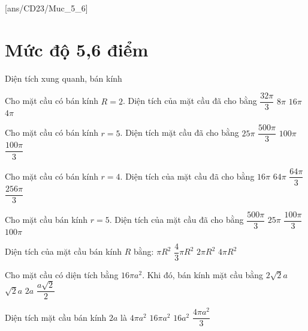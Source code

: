 [ans/CD23/Muc_5_6]
\setcounter{ex}{0}
\setcounter{dang}{0}
\section{Mức độ 5,6 điểm}
\begin{dang}
	{Diện tích xung quanh, bán kính}
\end{dang}
\begin{ex}
	Cho mặt cầu có bán kính $R=2$. Diện tích của mặt cầu đã cho bằng
	\choice
	{$\dfrac{32\pi}{3}$}
	{$8\pi $}
	{\True $16\pi $}
	{$4\pi $}
\end{ex}
\begin{ex}
	[Mã 102 - 2020 Lần 2]%
	Cho mặt cầu có bán kính $r=5$. Diện tích mặt cầu đã cho bằng
	\choice
	{$25\pi $}
	{$\dfrac{500\pi}{3}$}
	{\True $100\pi $}
	{$\dfrac{100\pi}{3}$}
\end{ex}
\begin{ex}
	[Mã 103 - 2020 Lần 2]%
	Cho mặt cầu có bán kính $r=4$. Diện tích của mặt cầu đã cho bằng
	\choice
	{$16\pi $}
	{\True $64\pi $}
	{$\dfrac{64\pi}{3}$}
	{$\dfrac{256\pi}{3}$}
\end{ex}
\begin{ex}
	[Mã 104 - 2020 Lần 2]%
	Cho mặt cầu bán kính $r=5$. Diện tích của mặt cầu đã cho bằng
	\choice
	{$\dfrac{500\pi}{3}$}
	{$25\pi $}
	{$\dfrac{100\pi}{3}$}
	{\True $100\pi $}
\end{ex}
\begin{ex}
	[Mã 101 2018]%
	Diện tích của mặt cầu bán kính $R$ bằng:
	\choice
	{$\pi{R^2}$}
	{$\dfrac{4}{3}\pi{R^2}$}
	{$2\pi{R^2}$}
	{\True $4\pi{R^2}$}
	\loigiai{}
\end{ex}
\begin{ex}
	Cho mặt cầu có diện tích bằng $16\pi{a^2}$. Khi đó, bán kính mặt cầu bằng
	\choice
	{$2\sqrt{2}a$}
	{$\sqrt{2}a$}
	{\True $2a$}
	{$\dfrac{a\sqrt{2}}{2}$}
\end{ex}
\begin{ex}
	Diện tích mặt cầu bán kính $2a$ là
	\choice
	{$4\pi{a^2}$}
	{\True $16\pi{a^2}$}
	{$16a^2$}
	{$\dfrac{4\pi{a^2}}{3}$}
\end{ex}
